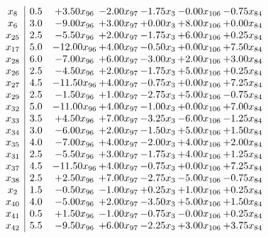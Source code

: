 \documentclass[8pt]{article}
\begin{document}
\[\begin{array}{c| c c@{\hskip 2pt} c@{\hskip 2pt} c@{\hskip 2pt} c@{\hskip 2pt} c@{\hskip 2pt} }
 x_{8}   &  0.5 & +  3.50 x_{96} & -2.00 x_{97} & -1.75 x_{3} & -0.00 x_{106} & -0.75 x_{84}\\
 x_{6}   &  3.0 & -9.00 x_{96} & +  3.00 x_{97} & +  0.00 x_{3} & +  8.00 x_{106} & +  0.00 x_{84}\\
 x_{25}   &  2.5 & -5.50 x_{96} & +  2.00 x_{97} & -1.75 x_{3} & +  6.00 x_{106} & +  0.25 x_{84}\\
 x_{17}   &  5.0 & -12.00 x_{96} & +  4.00 x_{97} & -0.50 x_{3} & +  0.00 x_{106} & +  7.50 x_{84}\\
 x_{28}   &  6.0 & -7.00 x_{96} & +  6.00 x_{97} & -3.00 x_{3} & +  2.00 x_{106} & +  3.00 x_{84}\\
 x_{26}   &  2.5 & -4.50 x_{96} & +  2.00 x_{97} & -1.75 x_{3} & +  5.00 x_{106} & +  0.25 x_{84}\\
 x_{27}   &  4.5 & -11.50 x_{96} & +  4.00 x_{97} & -0.75 x_{3} & +  0.00 x_{106} & +  7.25 x_{84}\\
 x_{29}   &  2.5 & -1.50 x_{96} & +  1.00 x_{97} & -2.75 x_{3} & +  5.00 x_{106} & -0.75 x_{84}\\
 x_{32}   &  5.0 & -11.00 x_{96} & +  4.00 x_{97} & -1.00 x_{3} & +  0.00 x_{106} & +  7.00 x_{84}\\
 x_{33}   &  3.5 & +  4.50 x_{96} & +  7.00 x_{97} & -3.25 x_{3} & -6.00 x_{106} & -1.25 x_{84}\\
 x_{34}   &  3.0 & -6.00 x_{96} & +  2.00 x_{97} & -1.50 x_{3} & +  5.00 x_{106} & +  1.50 x_{84}\\
 x_{35}   &  4.0 & -7.00 x_{96} & +  4.00 x_{97} & -2.00 x_{3} & +  4.00 x_{106} & +  2.00 x_{84}\\
 x_{31}   &  2.5 & -5.50 x_{96} & +  3.00 x_{97} & -1.75 x_{3} & +  4.00 x_{106} & +  1.25 x_{84}\\
 x_{37}   &  4.5 & -11.50 x_{96} & +  4.00 x_{97} & -0.75 x_{3} & +  0.00 x_{106} & +  7.25 x_{84}\\
 x_{38}   &  2.5 & +  2.50 x_{96} & +  7.00 x_{97} & -2.75 x_{3} & -5.00 x_{106} & -0.75 x_{84}\\
 x_{2}   &  1.5 & -0.50 x_{96} & -1.00 x_{97} & +  0.25 x_{3} & +  1.00 x_{106} & +  0.25 x_{84}\\
 x_{40}   &  4.0 & -5.00 x_{96} & +  2.00 x_{97} & -3.50 x_{3} & +  5.00 x_{106} & +  1.50 x_{84}\\
 x_{41}   &  0.5 & +  1.50 x_{96} & -1.00 x_{97} & -0.75 x_{3} & -0.00 x_{106} & +  0.25 x_{84}\\
 x_{42}   &  5.5 & -9.50 x_{96} & +  6.00 x_{97} & -2.25 x_{3} & +  3.00 x_{106} & +  3.75 x_{84}\\

\end{array}\]
\end{document}
